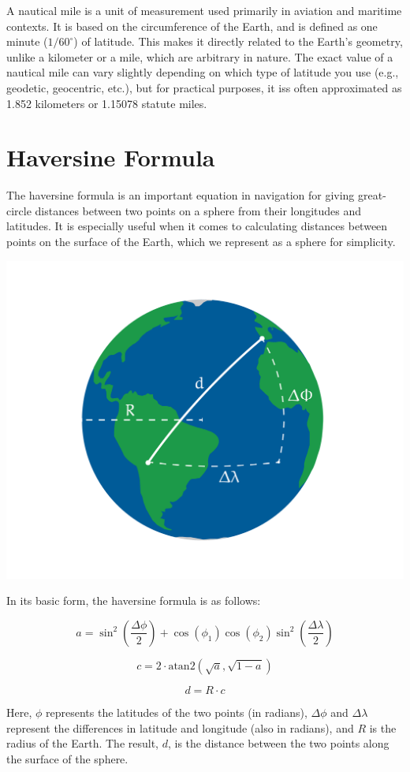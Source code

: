 A nautical mile is a unit of measurement used primarily in aviation
and maritime contexts. It is based on the circumference of the Earth,
and is defined as one minute ($1/60^{\circ}$) of latitude. This makes
it directly related to the Earth's geometry, unlike a kilometer or a
mile, which are arbitrary in nature. The exact value of a nautical
mile can vary slightly depending on which type of latitude you use
(e.g., geodetic, geocentric, etc.), but for practical purposes, it iss
often approximated as 1.852 kilometers or 1.15078 statute miles.

\section{Haversine Formula}

The haversine formula is an important equation in navigation for
giving great-circle distances between two points on a sphere from
their longitudes and latitudes. It is especially useful when it comes
to calculating distances between points on the surface of the Earth,
which we represent as a sphere for simplicity.

  \includegraphics[width=\textwidth]{haversine.png}


In its basic form, the haversine formula is as follows:

\[
a = \sin^2\left(\frac{\Delta\phi}{2}\right) + \cos(\phi_1)\cos(\phi_2)\sin^2\left(\frac{\Delta\lambda}{2}\right)
\]

\[
c = 2 \cdot \text{atan2} \left( \sqrt{a}, \sqrt{1-a} \right)
\]

\[
d = R \cdot c
\]

Here, $\phi$ represents the latitudes of the two points (in radians),
$\Delta\phi$ and $\Delta\lambda$ represent the differences in latitude
and longitude (also in radians), and $R$ is the radius of the
Earth. The result, $d$, is the distance between the two points along
the surface of the sphere.
